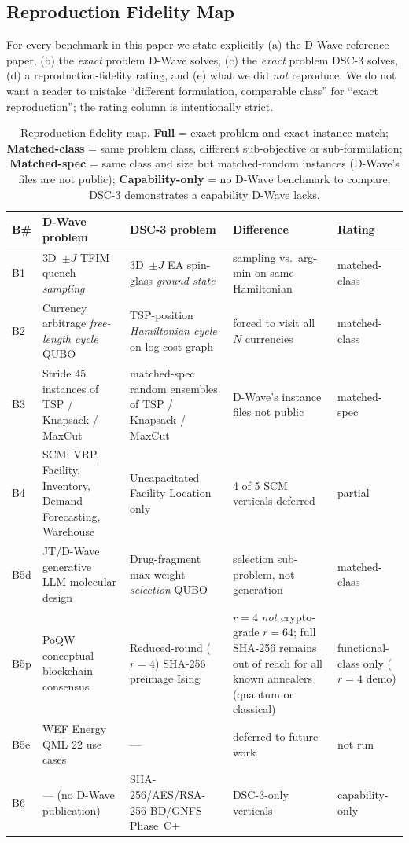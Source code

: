 \documentclass[11pt,a4paper]{article}
\begin{document}
\subsection*{Reproduction Fidelity Map}

For every benchmark in this paper we state explicitly (a) the D-Wave
reference paper, (b) the \emph{exact} problem D-Wave solves, (c) the
\emph{exact} problem DSC-3 solves, (d) a reproduction-fidelity rating, and
(e) what we did \emph{not} reproduce. We do not want a reader to mistake
``different formulation, comparable class'' for ``exact reproduction'';
the rating column is intentionally strict.

\begin{table}[h]
\centering
\caption{Reproduction-fidelity map. \textbf{Full} = exact problem and
exact instance match; \textbf{Matched-class} = same problem class,
different sub-objective or sub-formulation; \textbf{Matched-spec} = same
class and size but matched-random instances (D-Wave's files are not
public); \textbf{Capability-only} = no D-Wave benchmark to compare,
DSC-3 demonstrates a capability D-Wave lacks.}
\label{tab:fidelity_map}
\scriptsize
\begin{tabular}{lp{2.7cm}p{3.0cm}p{3.0cm}l}
\toprule
B\# & D-Wave problem & DSC-3 problem & Difference & Rating \\
\midrule
B1 & 3D~$\pm J$ TFIM quench \emph{sampling}~\cite{king_beyond_classical_2025} & 3D~$\pm J$ EA spin-glass \emph{ground state} & sampling vs.\ arg-min on same Hamiltonian & matched-class \\
B2 & Currency arbitrage \emph{free-length cycle} QUBO~\cite{cococcioni_2025} & TSP-position \emph{Hamiltonian cycle} on log-cost graph & forced to visit all $N$ currencies & matched-class \\
B3 & Stride 45 instances of TSP / Knapsack / MaxCut~\cite{booth_stride_2024} & matched-spec random ensembles of TSP / Knapsack / MaxCut & D-Wave's instance files not public & matched-spec \\
B4 & SCM: VRP, Facility, Inventory, Demand Forecasting, Warehouse~\cite{scm_survey_2025} & Uncapacitated Facility Location only & 4 of 5 SCM verticals deferred & partial \\
B5d & JT/D-Wave generative LLM molecular design~\cite{jt_dwave_2025} & Drug-fragment max-weight \emph{selection} QUBO & selection sub-problem, not generation & matched-class \\
B5p & PoQW conceptual blockchain consensus~\cite{noahbean_arms_race_2026} & Reduced-round ($r\!=\!4$) SHA-256 preimage Ising & $r\!=\!4$ \emph{not} crypto-grade $r\!=\!64$; full SHA-256 remains out of reach for all known annealers (quantum or classical) & functional-class only ($r\!=\!4$ demo) \\
B5e & WEF Energy QML 22 use cases~\cite{wef_energy_2026} & --- & deferred to future work & not run \\
B6 & --- (no D-Wave publication) & SHA-256/AES/RSA-256 BD/GNFS Phase~C+ & DSC-3-only verticals & capability-only \\
\bottomrule
\end{tabular}
\end{table}
\end{document}
